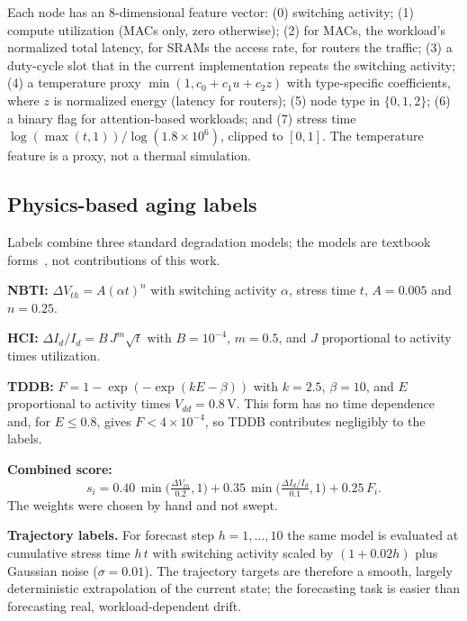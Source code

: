 \documentclass[conference]{IEEEtran}
\begin{document}
Each node has an 8-dimensional feature vector: (0) switching activity; (1) compute utilization (MACs only, zero otherwise); (2) for MACs, the workload's normalized total latency, for SRAMs the access rate, for routers the traffic; (3) a duty-cycle slot that in the current implementation repeats the switching activity; (4) a temperature proxy $\min(1, c_0 + c_1 u + c_2 z)$ with type-specific coefficients, where $z$ is normalized energy (latency for routers); (5) node type in $\{0,1,2\}$; (6) a binary flag for attention-based workloads; and (7) stress time $\log(\max(t,1))/\log(1.8\times 10^6)$, clipped to $[0,1]$. The temperature feature is a proxy, not a thermal simulation.

\subsection{Physics-based aging labels}
\label{sec:aging_models}

Labels combine three standard degradation models; the models are textbook forms~\cite{hill2022cmos}, not contributions of this work.

\textbf{NBTI:} $\Delta V_{th} = A (\alpha t)^n$ with switching activity $\alpha$, stress time $t$, $A = 0.005$ and $n = 0.25$.

\textbf{HCI:} $\Delta I_d / I_d = B\, J^m \sqrt{t}$ with $B = 10^{-4}$, $m = 0.5$, and $J$ proportional to activity times utilization.

\textbf{TDDB:} $F = 1 - \exp(-\exp(kE - \beta))$ with $k = 2.5$, $\beta = 10$, and $E$ proportional to activity times $V_{dd} = 0.8$\,V. This form has no time dependence and, for $E \le 0.8$, gives $F < 4\times 10^{-4}$, so TDDB contributes negligibly to the labels.

\textbf{Combined score:}
\begin{equation}
    s_i = 0.40\, \min\!\Big(\tfrac{\Delta V_{th}}{0.2},1\Big) + 0.35\, \min\!\Big(\tfrac{\Delta I_d/I_d}{0.1},1\Big) + 0.25\, F_i .
    \label{eq:aging_score}
\end{equation}
The weights were chosen by hand and not swept.

\textbf{Trajectory labels.} For forecast step $h = 1,\ldots,10$ the same model is evaluated at cumulative stress time $h\,t$ with switching activity scaled by $(1 + 0.02h)$ plus Gaussian noise ($\sigma = 0.01$). The trajectory targets are therefore a smooth, largely deterministic extrapolation of the current state; the forecasting task is easier than forecasting real, workload-dependent drift.
\end{document}
